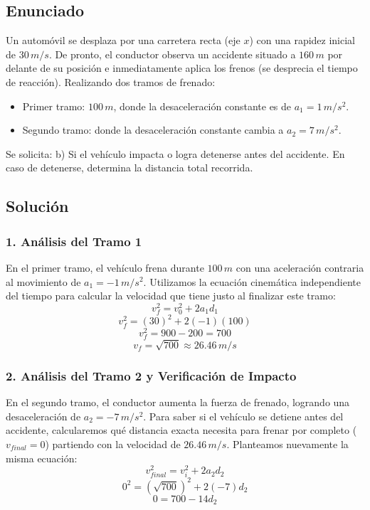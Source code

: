 \documentclass[12pt, a4paper]{article}
\begin{document}
\newpage

\subsection*{Enunciado}
Un automóvil se desplaza por una carretera recta (eje $x$) con una rapidez inicial de $30 \, \si{m/s}$. De pronto, el conductor observa un accidente situado a $160 \, \si{m}$ por delante de su posición e inmediatamente aplica los frenos (se desprecia el tiempo de reacción). Realizando dos tramos de frenado:
\begin{itemize}
    \item Primer tramo: $100 \, \si{m}$, donde la desaceleración constante es de $a_1 = 1 \, \si{m/s^2}$.
    \item Segundo tramo: donde la desaceleración constante cambia a $a_2 = 7 \, \si{m/s^2}$.
\end{itemize}
Se solicita:
b) Si el vehículo impacta o logra detenerse antes del accidente. En caso de detenerse, determina la distancia total recorrida.

\subsection*{Solución}

\subsubsection*{1. Análisis del Tramo 1}
En el primer tramo, el vehículo frena durante $100 \, \si{m}$ con una aceleración contraria al movimiento de $a_1 = -1 \, \si{m/s^2}$.
Utilizamos la ecuación cinemática independiente del tiempo para calcular la velocidad que tiene justo al finalizar este tramo:
$$ v_f^2 = v_0^2 + 2a_1 d_1 $$
$$ v_f^2 = (30)^2 + 2(-1)(100) $$
$$ v_f^2 = 900 - 200 = 700 $$
$$ v_f = \sqrt{700} \approx 26.46 \, \si{m/s} $$

\subsubsection*{2. Análisis del Tramo 2 y Verificación de Impacto}
En el segundo tramo, el conductor aumenta la fuerza de frenado, logrando una desaceleración de $a_2 = -7 \, \si{m/s^2}$.
Para saber si el vehículo se detiene antes del accidente, calcularemos qué distancia exacta necesita para frenar por completo ($v_{final} = 0$) partiendo con la velocidad de $26.46 \, \si{m/s}$.
Planteamos nuevamente la misma ecuación:
$$ v_{final}^2 = v_i^2 + 2a_2 d_2 $$
$$ 0^2 = (\sqrt{700})^2 + 2(-7)d_2 $$
$$ 0 = 700 - 14d_2 $$
\end{document}
